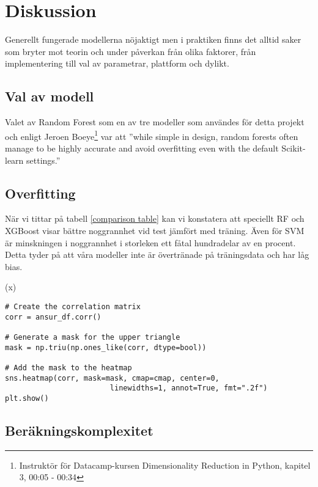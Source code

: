 \documentclass[12pt,a4paper]{article}
\begin{document}

\section{Diskussion}

Generellt fungerade modellerna nöjaktigt men i praktiken finns det alltid saker som bryter mot teorin och under påverkan från olika faktorer, från implementering till val av parametrar, plattform och dylikt.

\subsection{Val av modell}

Valet av Random Forest som en av tre modeller som användes för detta projekt och enligt Jeroen Boeye\footnote{\footnotesize{Instruktör för Datacamp-kursen Dimensionality Reduction in Python, kapitel 3, 00:05 - 00:34}} var att ''while simple in design, random forests often manage to be highly accurate and avoid overfitting even with the default Scikit-learn settings.''

\subsection{Overfitting}

När vi tittar på tabell \ref{comparison table} kan vi konstatera att speciellt RF och XGBoost visar bättre noggrannhet vid test jämfört med träning. Även för SVM är minskningen i noggrannhet i storleken ett fåtal hundradelar av en procent. Detta tyder på att våra modeller inte är övertränade på träningsdata och har låg bias.

\if(x)

\begin{table}[b]
\footnotesize
\caption{\footnotesize{???}}\label{???}
\begin{verbatim}
# Create the correlation matrix
corr = ansur_df.corr()

# Generate a mask for the upper triangle 
mask = np.triu(np.ones_like(corr, dtype=bool))

# Add the mask to the heatmap
sns.heatmap(corr, mask=mask, cmap=cmap, center=0, 
						linewidths=1, annot=True, fmt=".2f")
plt.show()
\end{verbatim}
\end{table}
\fi


\subsection{Beräkningskomplexitet}
\end{document}
